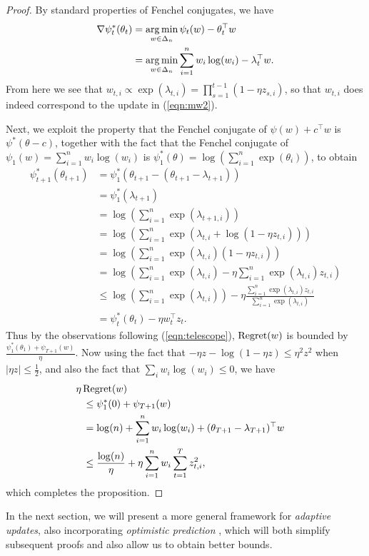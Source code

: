 \documentclass[paper_icml.tex]{subfiles}
\begin{document}
\begin{proof}
By standard properties of Fenchel conjugates, we have
\begin{align}
\nabla \psi_t^*(\theta_t) &= \argmin_{w \in \Delta_n} \psi_t(w) - \theta_t^{\top}w \\
 &= \argmin_{w \in \Delta_n} \sum_{i=1}^n w_i\log(w_i) - \lambda_t^{\top}w.
\end{align}
From here we see that 
$w_{t,i} \propto \exp(\lambda_{t,i}) = \prod_{s=1}^{t-1} (1-\eta z_{s,i})$, 
so that $w_{t,i}$ does indeed correspond to the update in (\ref{eqn:mw2}). 

Next, we exploit the property that the Fenchel conjugate of $\psi(w) + c^{\top}w$ 
is $\psi^*(\theta - c)$, together with the fact that the Fenchel conjugate of 
$\psi_1(w) = \sum_{i=1}^n w_i\log(w_i)$ is $\psi_1^*(\theta) = \log\left(\sum_{i=1}^n \exp(\theta_i)\right)$, 
to obtain
\begin{align*}
\psi_{t+1}^*(\theta_{t+1}) &= \psi_1^*(\theta_{t+1}-(\theta_{t+1}-\lambda_{t+1})) \\
 &= \psi_1^*(\lambda_{t+1}) \\
 &= \log(\sum_{i=1}^n \exp(\lambda_{t+1,i})) \\
 &= \log(\sum_{i=1}^n \exp(\lambda_{t,i} + \log(1 - \eta z_{t,i}))) \\
 &= \log(\sum_{i=1}^n \exp(\lambda_{t,i})(1 - \eta z_{t,i})) \\
 &= \log(\sum_{i=1}^n \exp(\lambda_{t,i}) - \eta \sum_{i=1}^n \exp(\lambda_{t,i})z_{t,i}) \\
 &\leq \log(\sum_{i=1}^n \exp(\lambda_{t,i})) - \eta \frac{\sum_{i=1}^n \exp(\lambda_{t,i})z_{t,i}}{\sum_{i=1}^n \exp(\lambda_{t,i})} \\
 &= \psi_t^*(\theta_t) - \eta w_t^{\top}z_t.
\end{align*}
Thus by the observations following (\ref{eqn:telescope}), $\operatorname{Regret}(w)$ is bounded by 
$\frac{\psi_1^*(\theta_1) + \psi_{T+1}(w)}{\eta}$. Now using the fact that 
$-\eta z - \log(1-\eta z) \leq \eta^2 z^2$ when $|\eta z| \leq \frac{1}{2}$, and also the 
fact that $\sum_i w_i\log(w_i) \leq 0$, we have
\begin{align*}
\lefteqn{\hskip -0.1in \eta\Regret(w)} \\
\hskip 0.1in &\leq \psi_1^*(0) + \psi_{T+1}(w) \\
 &= \log(n) + \sum_{i=1}^n w_i\log(w_i) %
    + (\theta_{T+1}-\lambda_{T+1})^{\top}w \\
 &\leq \frac{\log(n)}{\eta} + \eta \sum_{i=1}^n w_i \sum_{t=1}^T z_{t,i}^2,
\end{align*}
which completes the proposition.
\end{proof}
In the next section, we will present a more general framework for \emph{adaptive updates}, 
also incorporating \emph{optimistic prediction} \cite{rakhlin2012}, which will both simplify 
subsequent proofs and also allow us to obtain better bounds.
\end{document}
